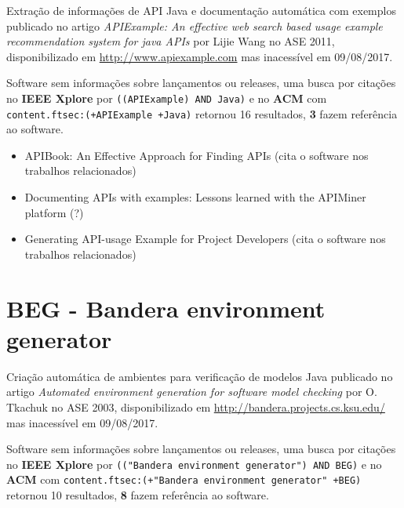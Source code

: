 Extração de informações de API Java e documentação automática com exemplos
publicado no artigo {\it APIExample: An effective web search based usage example recommendation system for java APIs}
por Lijie Wang
no ASE 2011,
disponibilizado em \url{http://www.apiexample.com}
mas inacessível em 09/08/2017.

Software sem informações sobre lançamentos ou releases,
uma busca por citações no {\bf IEEE Xplore} por
\texttt{((APIExample) AND Java)}
e no {\bf ACM} com
\texttt{content.ftsec:(+APIExample +Java)}
retornou
16 resultados,
{\bf 3} fazem referência ao software.

\begin{itemize}
\item APIBook: An Effective Approach for Finding APIs (cita o software nos trabalhos relacionados)
\item Documenting APIs with examples: Lessons learned with the APIMiner platform (?)
\item Generating API-usage Example for Project Developers (cita o software nos trabalhos relacionados)
\end{itemize}

\section{BEG - Bandera environment generator}

Criação automática de ambientes para verificação de modelos Java
publicado no artigo {\it Automated environment generation for software model checking}
por O. Tkachuk
no ASE 2003,
disponibilizado em \url{http://bandera.projects.cs.ksu.edu/}
mas inacessível em 09/08/2017.

Software sem informações sobre lançamentos ou releases,
uma busca por citações no {\bf IEEE Xplore} por
\texttt{(("Bandera environment generator") AND BEG)}
e no {\bf ACM} com
\texttt{content.ftsec:(+"Bandera environment generator" +BEG)}
retornou
10 resultados,
{\bf 8} fazem referência ao software.

